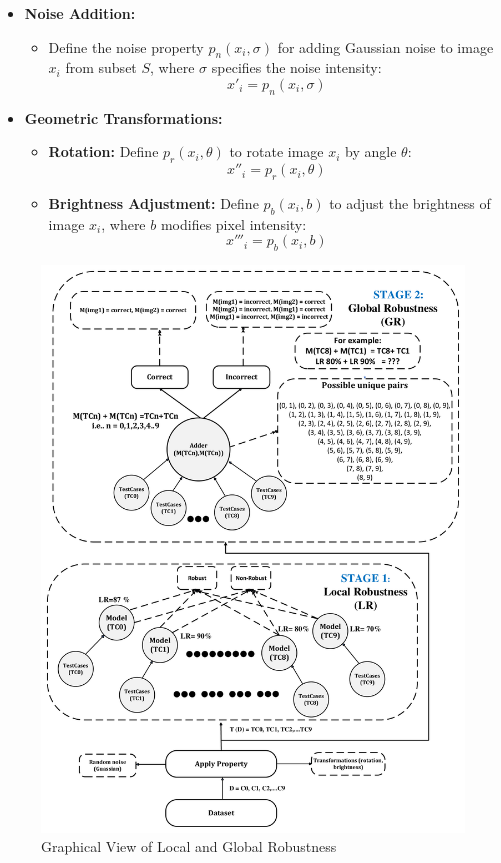 \documentclass[10pt, conference, a4paper, final]{IEEEtran}
\begin{document}
\begin{itemize}
    \item \textbf{Noise Addition:}
        \begin{itemize}
            \item Define the noise property \( p_n(x_i, \sigma) \) for adding Gaussian noise to image \( x_i \) from subset \( S \), where \( \sigma \) specifies the noise intensity:
            \[ x'_i = p_n(x_i, \sigma) \]
        \end{itemize}

    \item \textbf{Geometric Transformations:}
        \begin{itemize}
            \item \textbf{Rotation:} Define \( p_r(x_i, \theta) \) to rotate image \( x_i \) by angle \( \theta \):
            \[ x''_i = p_r(x_i, \theta) \]
            \item \textbf{Brightness Adjustment:} Define \( p_b(x_i, b) \) to adjust the brightness of image \( x_i \), where \( b \) modifies pixel intensity:
            \[ x'''_i = p_b(x_i, b) \]
        \end{itemize}
\end{itemize}

\begin{figure}{}
    \centering
    \includegraphics[width=\linewidth]{paper_images/MNIST Adder.pdf}
    \caption{Graphical View of Local and Global Robustness}
    \label{fig:graph}
\end{figure}
\end{document}
